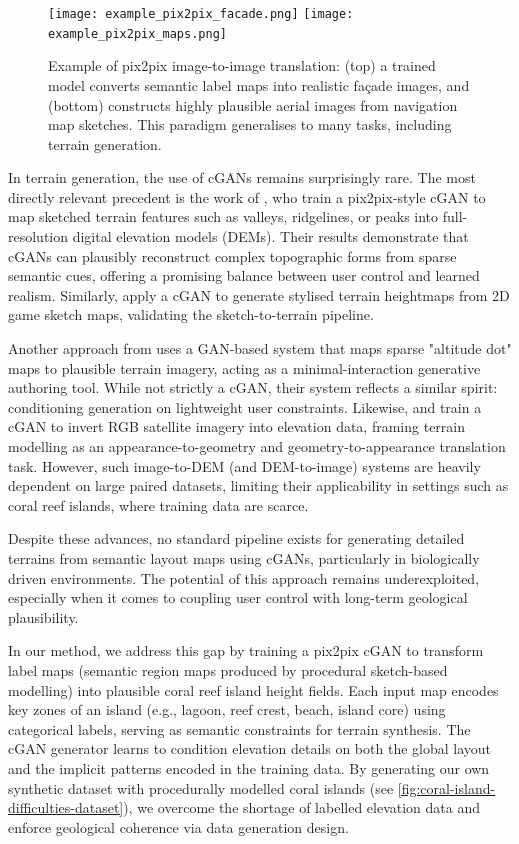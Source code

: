 \begin{figure}
    \texttt{[image: example\_pix2pix\_facade.png]}
    \texttt{[image: example\_pix2pix\_maps.png]}
    \caption{Example of pix2pix image-to-image translation: (top) a trained model converts semantic label maps into realistic façade images, and (bottom) constructs highly plausible aerial images from navigation map sketches. This paradigm generalises to many tasks, including terrain generation.}
    \label{fig:coral-island-pix2pix-example}
\end{figure}

In terrain generation, the use of cGANs remains surprisingly rare. The most directly relevant precedent is the work of \cite{Guerin2017}, who train a pix2pix-style cGAN to map sketched terrain features such as valleys, ridgelines, or peaks into full-resolution digital elevation models (DEMs). Their results demonstrate that cGANs can plausibly reconstruct complex topographic forms from sparse semantic cues, offering a promising balance between user control and learned realism. Similarly, \cite{Sisodia2022} apply a cGAN to generate stylised terrain heightmaps from 2D game sketch maps, validating the sketch-to-terrain pipeline.

Another approach from \cite{Voulgaris2021} uses a GAN-based system that maps sparse "altitude dot" maps to plausible terrain imagery, acting as a minimal-interaction generative authoring tool. While not strictly a cGAN, their system reflects a similar spirit: conditioning generation on lightweight user constraints. Likewise, \cite{Panagiotou2020} and \cite{Beckham2017} train a cGAN to invert RGB satellite imagery into elevation data, framing terrain modelling as an appearance-to-geometry and geometry-to-appearance translation task. However, such image-to-DEM (and DEM-to-image) systems are heavily dependent on large paired datasets, limiting their applicability in settings such as coral reef islands, where training data are scarce.

Despite these advances, no standard pipeline exists for generating detailed terrains from semantic layout maps using cGANs, particularly in biologically driven environments.
The potential of this approach remains underexploited, especially when it comes to coupling user control with long-term geological plausibility.

\midConclusion

In our method, we address this gap by training a pix2pix cGAN to transform label maps (semantic region maps produced by procedural sketch-based modelling) into plausible coral reef island height fields. Each input map encodes key zones of an island (e.g., lagoon, reef crest, beach, island core) using categorical labels, serving as semantic constraints for terrain synthesis. The cGAN generator learns to condition elevation details on both the global layout and the implicit patterns encoded in the training data. By generating our own synthetic dataset with procedurally modelled coral islands (see \cref{fig:coral-island-difficulties-dataset}), we overcome the shortage of labelled elevation data and enforce geological coherence via data generation design.

